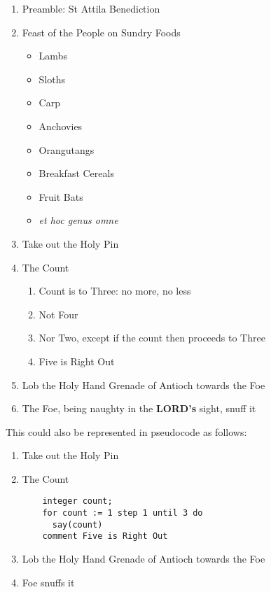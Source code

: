 \documentclass{metanorma}
\begin{document}
\begin{enumerate}
  \item Preamble: St Attila Benediction
  \item Feast of the People on Sundry Foods
    \begin{itemize}
      \item Lambs
      \item Sloths
      \item Carp
      \item Anchovies
      \item Orangutangs
      \item Breakfast Cereals
      \item Fruit Bats
      \item \textit{et hoc genus omne}
    \end{itemize}
  \item Take out the Holy Pin
  \item The Count
    \begin{enumerate}%
      \item Count is to Three: no more, no less
      \item Not Four
      \item Nor Two, except if the count then proceeds to Three
      \item Five is Right Out
    \end{enumerate}
  \item Lob the Holy Hand Grenade of Antioch towards the Foe
  \item The Foe, being naughty in the \textbf{LORD's} sight,  snuff it
\end{enumerate}


This could also be represented in pseudocode as follows:


\begin{enumerate}
  \item Take out the Holy Pin
  \item The Count
    \begin{verbatim}
    integer count;
    for count := 1 step 1 until 3 do
      say(count)
    comment Five is Right Out
    \end{verbatim}
  \item Lob the Holy Hand Grenade of Antioch towards the Foe
  \item Foe snuffs it
\end{enumerate}
\end{document}
